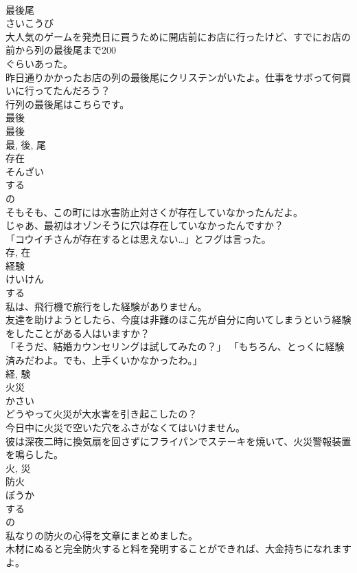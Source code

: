 \documentclass[8pt]{extreport}
\begin{document}
\begin{CJK}{UTF8}{min}
\\	最後尾	
\\	さいこうび	
\\	大人気のゲームを発売日に買うために開店前にお店に行ったけど、すでにお店の前から列の最後尾まで200
\\	ぐらいあった。	
\\	昨日通りかかったお店の列の最後尾にクリステンがいたよ。仕事をサボって何買いに行ってたんだろう？	
\\	行列の最後尾はこちらです。	
\\	最後 
\\	最後 
\\	最, 後, 尾	
\\	存在	
\\	そんざい	
\\	する 
\\	の 
\\	そもそも、この町には水害防止対さくが存在していなかったんだよ。	
\\	じゃあ、最初はオゾンそうに穴は存在していなかったんですか？	
\\	「コウイチさんが存在するとは思えない…」とフグは言った。	
\\	存, 在	
\\	経験	
\\	けいけん	
\\	する 
\\	私は、飛行機で旅行をした経験がありません。	
\\	友達を助けようとしたら、今度は非難のほこ先が自分に向いてしまうという経験をしたことがある人はいますか？	
\\	「そうだ、結婚カウンセリングは試してみたの？」 「もちろん、とっくに経験済みだわよ。でも、上手くいかなかったわ。」	
\\	経, 験	
\\	火災	
\\	かさい	
\\	どうやって火災が大水害を引き起こしたの？	
\\	今日中に火災で空いた穴をふさがなくてはいけません。	
\\	彼は深夜二時に換気扇を回さずにフライパンでステーキを焼いて、火災警報装置を鳴らした。	
\\	火, 災	
\\	防火	
\\	ぼうか	
\\	する 
\\	の 
\\	私なりの防火の心得を文章にまとめました。	
\\	木材にぬると完全防火すると料を発明することができれば、大金持ちになれますよ。	

\end{CJK}
\end{document}

